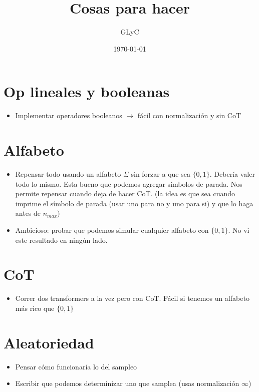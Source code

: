 \documentclass{article}
\title{Cosas para hacer}
\author{GLyC}
\date{\today}
\begin{document}
\maketitle

\section{Op lineales y booleanas}

\begin{itemize}
    \item Implementar operadores booleanos $\rightarrow$ fácil con normalización y sin CoT
\end{itemize}



\section{Alfabeto}

\begin{itemize}
    \item Repensar todo usando un alfabeto $\Sigma$ sin forzar a que sea $\{0,1\}$. Debería valer todo lo mismo. Esta bueno que podemos agregar símbolos de parada. Nos permite repensar cuando deja de hacer CoT. (la idea es que sea cuando imprime el símbolo de parada (usar uno para no y uno para si) y que lo haga antes de $n_{max}$)
    \item Ambicioso: probar que podemos simular cualquier alfabeto con $\{0,1\}$. No vi este resultado en ningún lado.
\end{itemize}



\section{CoT}

\begin{itemize}
    \item Correr dos transformers a la vez pero con CoT. Fácil si tenemos un alfabeto más rico que $\{0,1\}$
\end{itemize}



\section{Aleatoriedad}
\begin{itemize}
    \item Pensar cómo funcionaría lo del sampleo
    \item Escribir que podemos determinizar uno que samplea (usas normalización $\infty$)
\end{itemize}
\end{document}
